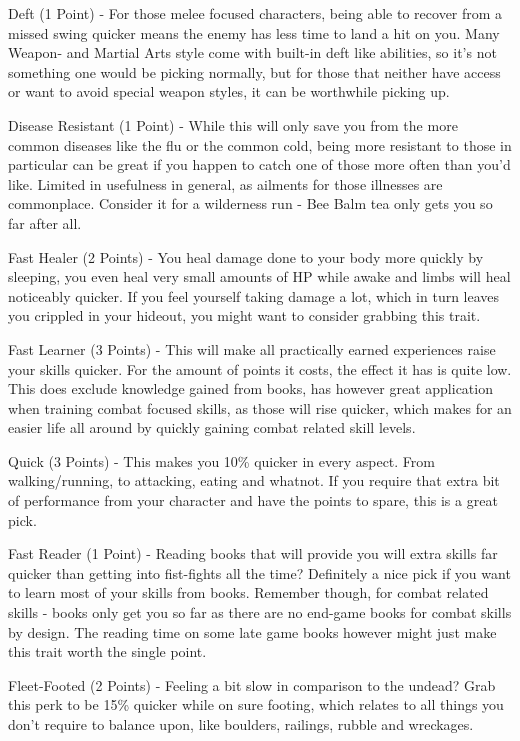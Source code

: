 \documentclass[11pt]{report}
\begin{document}
Deft (1 Point) - For those melee focused characters, being able to recover from a missed swing quicker means the enemy has less time to land a hit on you. Many Weapon- and Martial Arts style come with built-in deft like abilities, so it's not something one would be picking normally, but for those that neither have access or want to avoid special weapon styles, it can be worthwhile picking up.

Disease Resistant (1 Point) - While this will only save you from the more common diseases like the flu or the common cold, being more resistant to those in particular can be great if you happen to catch one of those more often than you'd like. Limited in usefulness in general, as ailments for those illnesses are commonplace. Consider it for a wilderness run - Bee Balm tea only gets you so far after all.

Fast Healer (2 Points) - You heal damage done to your body more quickly by sleeping, you even heal very small amounts of HP while awake and limbs will heal noticeably quicker. If you feel yourself taking damage a lot, which in turn leaves you crippled in your hideout, you might want to consider grabbing this trait.

Fast Learner (3 Points) - This will make all practically earned experiences raise your skills quicker. For the amount of points it costs, the effect it has is quite low. This does exclude knowledge gained from books, has however great application when training combat focused skills, as those will rise quicker, which makes for an easier life all around by quickly gaining combat related skill levels.

Quick (3 Points) - This makes you 10\% quicker in every aspect. From walking/running, to attacking, eating and whatnot. If you require that extra bit of performance from your character and have the points to spare, this is a great pick.

Fast Reader (1 Point) - Reading books that will provide you will extra skills far quicker than getting into fist-fights all the time? Definitely a nice pick if you want to learn most of your skills from books. Remember though, for combat related skills - books only get you so far as there are no end-game books for combat skills by design. The reading time on some late game books however might just make this trait worth the single point.

Fleet-Footed (2 Points) - Feeling a bit slow in comparison to the undead? Grab this perk to be 15\% quicker while on sure footing, which relates to all things you don't require to balance upon, like boulders, railings, rubble and wreckages.
\end{document}
